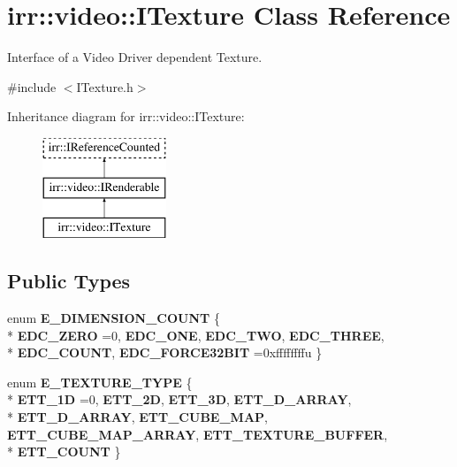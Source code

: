 \hypertarget{classirr_1_1video_1_1ITexture}{}\section{irr\+:\+:video\+:\+:I\+Texture Class Reference}
\label{classirr_1_1video_1_1ITexture}


Interface of a Video Driver dependent Texture.  




{\ttfamily \#include $<$I\+Texture.\+h$>$}

Inheritance diagram for irr\+:\+:video\+:\+:I\+Texture\+:\begin{figure}[H]
\begin{center}
\leavevmode
\includegraphics[height=3.000000cm]{classirr_1_1video_1_1ITexture}
\end{center}
\end{figure}
\subsection*{Public Types}
\begin{DoxyCompactItemize}
\item 
enum {\bfseries E\+\_\+\+D\+I\+M\+E\+N\+S\+I\+O\+N\+\_\+\+C\+O\+U\+NT} \{ \\*
{\bfseries E\+D\+C\+\_\+\+Z\+E\+RO} =0, 
{\bfseries E\+D\+C\+\_\+\+O\+NE}, 
{\bfseries E\+D\+C\+\_\+\+T\+WO}, 
{\bfseries E\+D\+C\+\_\+\+T\+H\+R\+EE}, 
\\*
{\bfseries E\+D\+C\+\_\+\+C\+O\+U\+NT}, 
{\bfseries E\+D\+C\+\_\+\+F\+O\+R\+C\+E32\+B\+IT} =0xffffffffu
 \}\hypertarget{classirr_1_1video_1_1ITexture_aa9cf6e10681c560af2805086dc8cac79}{}\label{classirr_1_1video_1_1ITexture_aa9cf6e10681c560af2805086dc8cac79}

\item 
enum {\bfseries E\+\_\+\+T\+E\+X\+T\+U\+R\+E\+\_\+\+T\+Y\+PE} \{ \\*
{\bfseries E\+T\+T\+\_\+1D} =0, 
{\bfseries E\+T\+T\+\_\+2D}, 
{\bfseries E\+T\+T\+\_\+3D}, 
{\bfseries E\+T\+T\+\_\+D\+\_\+\+A\+R\+R\+AY}, 
\\*
{\bfseries E\+T\+T\+\_\+D\+\_\+\+A\+R\+R\+AY}, 
{\bfseries E\+T\+T\+\_\+\+C\+U\+B\+E\+\_\+\+M\+AP}, 
{\bfseries E\+T\+T\+\_\+\+C\+U\+B\+E\+\_\+\+M\+A\+P\+\_\+\+A\+R\+R\+AY}, 
{\bfseries E\+T\+T\+\_\+\+T\+E\+X\+T\+U\+R\+E\+\_\+\+B\+U\+F\+F\+ER}, 
\\*
{\bfseries E\+T\+T\+\_\+\+C\+O\+U\+NT}
 \}\hypertarget{classirr_1_1video_1_1ITexture_ad1ac61e4b7342c0e93e12f723dbfd83d}{}\label{classirr_1_1video_1_1ITexture_ad1ac61e4b7342c0e93e12f723dbfd83d}

\end{DoxyCompactItemize}
